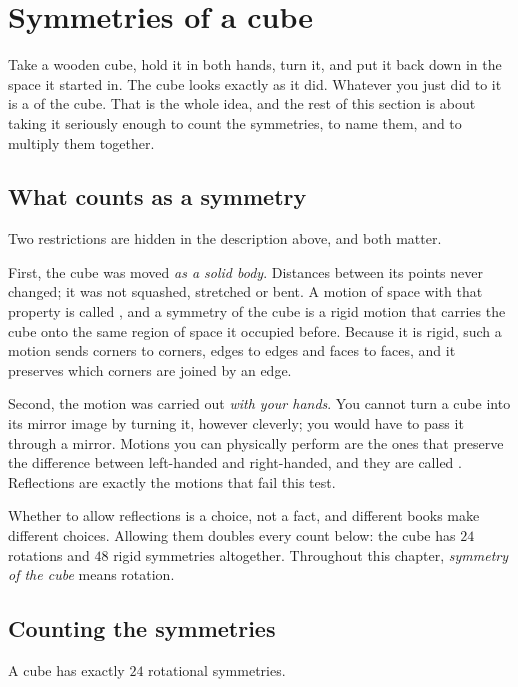 \section{Symmetries of a cube}

Take a wooden cube, hold it in both hands, turn it, and put it back down in the space it started
in. The cube looks exactly as it did. Whatever you just did to it is a  of the cube.
That is the whole idea, and the rest of this section is about taking it seriously enough to count
the symmetries, to name them, and to multiply them together.

\subsection{What counts as a symmetry}

Two restrictions are hidden in the description above, and both matter.

First, the cube was moved \emph{as a solid body}. Distances between its points never changed; it
was not squashed, stretched or bent. A motion of space with that property is called ,
and a symmetry of the cube is a rigid motion that carries the cube onto the same region of space it
occupied before. Because it is rigid, such a motion sends corners to corners, edges to edges and
faces to faces, and it preserves which corners are joined by an edge.

Second, the motion was carried out \emph{with your hands}. You cannot turn a cube into its mirror
image by turning it, however cleverly; you would have to pass it through a mirror. Motions you can
physically perform are the ones that preserve the difference between left-handed and right-handed,
and they are called . Reflections are exactly the motions that fail
this test.

\begin{rem}
Whether to allow reflections is a choice, not a fact, and different books make different choices.
Allowing them doubles every count below: the cube has $24$ rotations and $48$ rigid symmetries
altogether. Throughout this chapter, \emph{symmetry of the cube} means rotation.
\end{rem}

\subsection{Counting the symmetries}

\begin{prop}\label{prop:24}
A cube has exactly $24$ rotational symmetries.
\end{prop}

